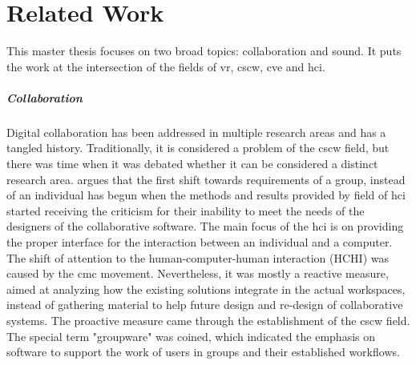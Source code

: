 \chapter{Related Work}

This master thesis focuses on two broad topics: collaboration and sound. It puts the work at the intersection of the fields of \gls{vr}, \gls{cscw}, \gls{cve} and \gls{hci}.

\paragraph[]{Collaboration}
Digital collaboration has been addressed in multiple research areas and has a tangled history. Traditionally, it is considered a problem of the \gls{cscw} field, but there was time when it was debated whether it can be considered a distinct research area. \cite{bannon_perspectives_nodate} argues that the first shift towards requirements of a group, instead of an individual has begun when the methods and results provided by field of \gls{hci} started receiving the criticism for their inability to meet the needs of the designers of the collaborative software. The main focus of the \gls{hci} is on providing the proper interface for the interaction between an individual and a computer. The shift of attention to the human-computer-human interaction (HCHI) was caused by the \gls{cmc} movement. Nevertheless, it was mostly a reactive measure, aimed at analyzing how the existing solutions integrate in the actual workspaces, instead of gathering material to help future design and re-design of collaborative systems. The proactive measure came through the establishment of the \gls{cscw} field. The special term "groupware" was coined, which indicated the emphasis on software to support the work of users in groups and their established workflows.

